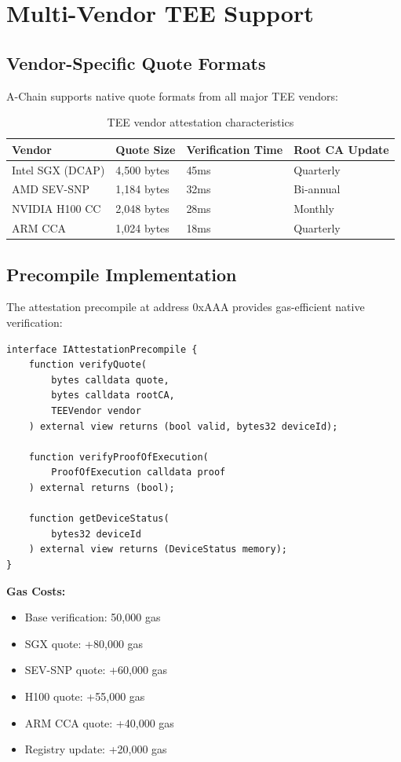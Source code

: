 \section{Multi-Vendor TEE Support}


\subsection{Vendor-Specific Quote Formats}

A-Chain supports native quote formats from all major TEE vendors:

\begin{table}[h]
\centering
\begin{tabular}{@{}llll@{}}
\toprule
\textbf{Vendor} & \textbf{Quote Size} & \textbf{Verification Time} & \textbf{Root CA Update} \\ \midrule
Intel SGX (DCAP) & 4,500 bytes & 45ms & Quarterly \\
AMD SEV-SNP & 1,184 bytes & 32ms & Bi-annual \\
NVIDIA H100 CC & 2,048 bytes & 28ms & Monthly \\
ARM CCA & 1,024 bytes & 18ms & Quarterly \\ \bottomrule
\end{tabular}
\caption{TEE vendor attestation characteristics}
\end{table}

\subsection{Precompile Implementation}

The attestation precompile at address 0xAAA provides gas-efficient native verification:

\begin{lstlisting}[language=Solidity, basicstyle=\small\ttfamily]
interface IAttestationPrecompile {
    function verifyQuote(
        bytes calldata quote,
        bytes calldata rootCA,
        TEEVendor vendor
    ) external view returns (bool valid, bytes32 deviceId);
    
    function verifyProofOfExecution(
        ProofOfExecution calldata proof
    ) external returns (bool);
    
    function getDeviceStatus(
        bytes32 deviceId
    ) external view returns (DeviceStatus memory);
}
\end{lstlisting}

\textbf{Gas Costs:}
\begin{itemize}
\item Base verification: 50,000 gas
\item SGX quote: +80,000 gas
\item SEV-SNP quote: +60,000 gas
\item H100 quote: +55,000 gas
\item ARM CCA quote: +40,000 gas
\item Registry update: +20,000 gas
\end{itemize}

